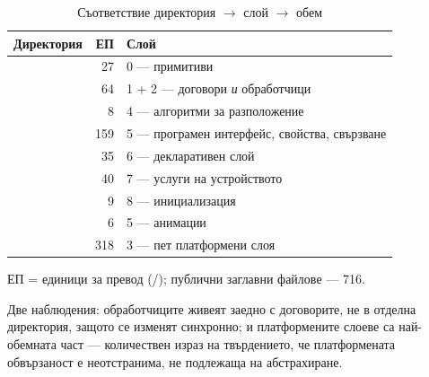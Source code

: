 \begin{table}[H]
\caption{Съответствие директория $\rightarrow$ слой $\rightarrow$ обем}
\label{tab:dirs}
\centering\small
\begin{tabular}{@{}L{3.4cm}rL{7.4cm}@{}}
\hline
\textbf{Директория} & \textbf{ЕП} & \textbf{Слой} \\
\hline
{}   & 27  & 0 --- примитиви \\
       & 64  & 1 + 2 --- договори \emph{и} обработчици \\
    & 8   & 4 --- алгоритми за разположение \\
   & 159 & 5 --- програмен интерфейс, свойства, свързване \\
       & 35  & 6 --- декларативен слой \\
 & 40  & 7 --- услуги на устройството \\
    & 9   & 8 --- инициализация \\
 & 6   & 5 --- анимации \\
   & 318 & 3 --- пет платформени слоя \\
\hline
\end{tabular}
\end{table}
\noindent\small ЕП = единици за превод (/); публични заглавни
файлове --- 716.\normalsize

Две наблюдения: обработчиците живеят заедно с договорите, не в отделна директория, защото
се изменят синхронно; и платформените слоеве са най-обемната част --- количествен израз на
твърдението, че платформената обвързаност е неотстранима, не подлежаща на абстрахиране.

